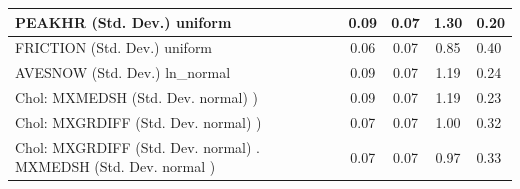 \begin{table}
\begin{center}
\begin{tabular}{|l|l|c|c|c|l|}
			PEAKHR (Std. Dev.) uniform &  & 0.09 & 0.07 & 1.30 & 0.20 \\
			\hline
			FRICTION (Std. Dev.) uniform &  & 0.06 & 0.07 & 0.85 & 0.40 \\
			\hline
			AVESNOW (Std. Dev.) ln_normal &  & 0.09 & 0.07 & 1.19 & 0.24 \\
			\hline
			 Chol: MXMEDSH (Std. Dev. normal) ) &  & 0.09 & 0.07 & 1.19 & 0.23 \\
			\hline
			 Chol: MXGRDIFF (Std. Dev. normal) ) &  & 0.07 & 0.07 & 1.00 & 0.32 \\
			\hline
			 Chol: MXGRDIFF (Std. Dev. normal) . MXMEDSH (Std. Dev.   normal ) &  & 0.07 & 0.07 & 0.97 & 0.33 \\
			\hline
		\end{tabular}
	\end{center}
\end{table}